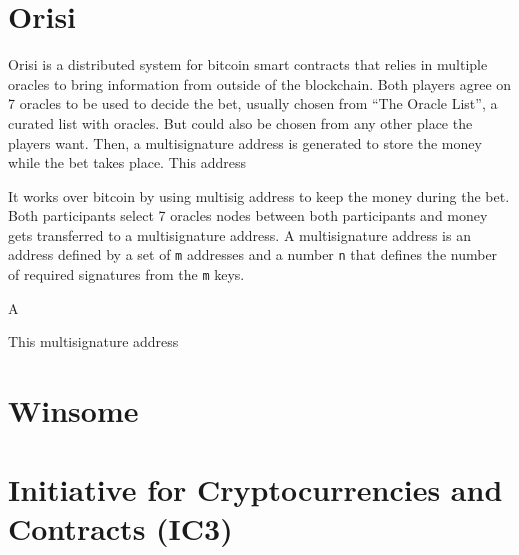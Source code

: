 \section{Orisi}
Orisi is a distributed system for bitcoin smart contracts that relies in
  multiple oracles to bring information from outside of the blockchain.
Both players agree on 7 oracles to be used to decide the bet, usually chosen
  from ``The Oracle List'', a curated list with oracles. But could also be
  chosen from any other place the players want. Then, a multisignature
  address is generated to store the money while the bet takes place. This
  address

It works over bitcoin by using multisig address to keep the money during
  the bet.
  Both participants select 7 oracles nodes between both participants and money gets
  transferred to a multisignature address. A multisignature address is an
  address defined by a set of \texttt{m} addresses and a number \texttt{n}
  that defines the number of required signatures from the \texttt{m} keys.

A

  This multisignature address


\section{Winsome}

\section{Initiative for Cryptocurrencies and Contracts (IC3)}
